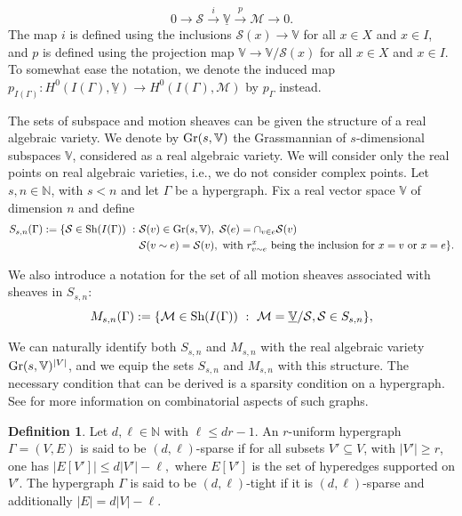 \documentclass{article}
\theoremstyle{definition}
\newtheorem{definition}[theorem]{Definition}
\theoremstyle{remark}
\begin{document}
    \begin{equation}\label{ses}
        0\rightarrow \mathcal{S} \xrightarrow{i}   \underline{\mathbb{V}} \xrightarrow{p} \mathcal{M} \rightarrow 0.
    \end{equation}
    The map $i$ is defined using the inclusions $\mathcal{S}(x) \rightarrow \mathbb{V}$ for all $x\in X$ and $x\in I$, and $p$ is defined using the projection map $\mathbb{V} \rightarrow  \mathbb{V}/\mathcal{S}(x)$ for all $x\in X$ and $x\in I$. To somewhat ease the notation, we denote the induced map $p_{I(\Gamma)}: H^{0}(I(\Gamma), \underline{\mathbb{V}}) \rightarrow H^{0}(I(\Gamma), \mathcal{M})$ by $p_{\Gamma}$ instead.

The sets of subspace and motion sheaves can be given the structure of a real algebraic variety. We denote by $\textup{Gr}(s, \mathbb{V})$ the Grassmannian of $s$-dimensional subspaces $\mathbb{V}$, considered as a real algebraic variety. We will consider only the real points on real algebraic varieties, i.e., we do not consider complex points. Let $s,n\in \mathbb{N}$, with $s < n$ and let $\Gamma$ be a hypergraph. Fix a real vector space $\mathbb{V}$ of dimension $n$ and define
\begin{align*}   
S_{s, n}(\Gamma):=\{\mathcal{S} \in \textup{Sh}(I(\Gamma)) ~:~ &\mathcal{S}(v)\in \textup{Gr}(s,\mathbb{V}), ~ \mathcal{S}(e)  = \cap_{v\in e} \mathcal{S}(v) \\
&\mathcal{S}(v\sim e) = \mathcal{S}(v), \text{ with $r^{x}_{v\sim e}$ being the inclusion for $x=v$ or $x=e$}\}.
\end{align*}

We also introduce a notation for the set of all motion sheaves associated with sheaves in $S_{s,n}$:
$$
M_{s, n}(\Gamma):=\{\mathcal{M} \in \textup{Sh}(I(\Gamma))~:~ \mathcal{M}= \underline{\mathbb{V}}/\mathcal{S}, \mathcal{S} \in S_{s,n}  \},$$

We can naturally identify both $S_{s, n}$ and $M_{s,n}$ with the real algebraic variety $\textup{Gr}(s, \mathbb{V})^{|V|}$, and we equip the sets $S_{s,n}$ and $M_{s,n}$ with this structure. The necessary condition that can be derived is a sparsity condition on a hypergraph. See \cite{MR2552675} for more information on combinatorial aspects of such graphs. 

\begin{definition}\label{def: sparse}
    Let $d, \ell \in \mathbb{N}$ with $\ell \leq dr-1$. An $r$-uniform hypergraph $\Gamma=(V, E)$ is said to be $(d, \ell)$-sparse if for all subsets $V' \subseteq V$, with $|V'|\geq r$, one has $|E[V']| \leq d|V'| - \ell,$ where $E[V']$ is the set of hyperedges supported on $V'$. The hypergraph $\Gamma$ is said to be $(d, \ell)$-tight if it is $(d, \ell)$-sparse and additionally $|E|= d|V| - \ell$. 
\end{definition}
\end{document}
